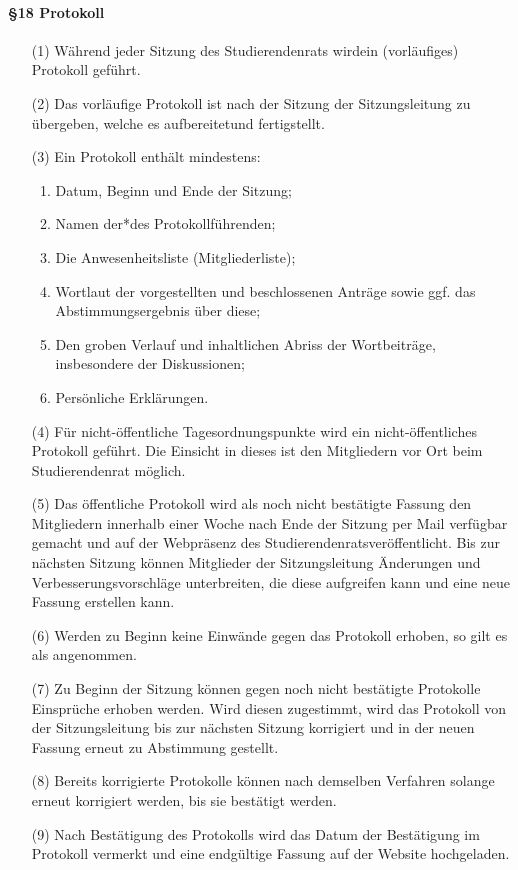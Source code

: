         \paragraph{§18 Protokoll}
            \begin{itemize}
                \item[(1)] Während jeder Sitzung des Studierendenrats wirdein (vorläufiges) Protokoll geführt.
                \item[(2)] Das vorläufige Protokoll ist nach der Sitzung der Sitzungsleitung zu übergeben, welche es aufbereitetund fertigstellt.
                \item[(3)] Ein Protokoll enthält mindestens:
                    \begin{enumerate}
                        \item Datum, Beginn und Ende der Sitzung;
                        \item Namen der*des Protokollführenden; 
                        \item Die Anwesenheitsliste (Mitgliederliste); 
                        \item Wortlaut der vorgestellten und beschlossenen Anträge sowie ggf. das Abstimmungsergebnis über diese;
                        \item Den groben Verlauf und inhaltlichen Abriss der Wortbeiträge, insbesondere der Diskussionen; 
                        \item Persönliche Erklärungen.
                    \end{enumerate}
                \item[(4)] Für nicht-öffentliche Tagesordnungspunkte wird ein nicht-öffentliches Protokoll geführt. Die Einsicht in dieses ist den Mitgliedern vor Ort beim Studierendenrat möglich. 
                \item[(5)] Das öffentliche Protokoll wird als noch nicht bestätigte Fassung den Mitgliedern innerhalb einer Woche nach Ende der Sitzung per Mail verfügbar gemacht und auf der Webpräsenz des Studierendenratsveröffentlicht. Bis zur nächsten Sitzung können Mitglieder der Sitzungsleitung Änderungen und Verbesserungsvorschläge unterbreiten, die diese aufgreifen kann und eine neue Fassung erstellen kann.
                \item[(6)] Werden zu Beginn keine Einwände gegen das Protokoll erhoben, so gilt es als angenommen.
                \item[(7)] Zu Beginn der Sitzung können gegen noch nicht bestätigte Protokolle Einsprüche erhoben werden. Wird diesen zugestimmt, wird das Protokoll von der Sitzungsleitung bis zur nächsten Sitzung korrigiert und in der neuen Fassung erneut zu Abstimmung gestellt.
                \item[(8)] Bereits korrigierte Protokolle können nach demselben Verfahren solange erneut korrigiert werden, bis sie bestätigt werden.
                \item[(9)] Nach Bestätigung des Protokolls wird das Datum der Bestätigung im Protokoll vermerkt und eine endgültige Fassung auf der Website hochgeladen.
            \end{itemize}
